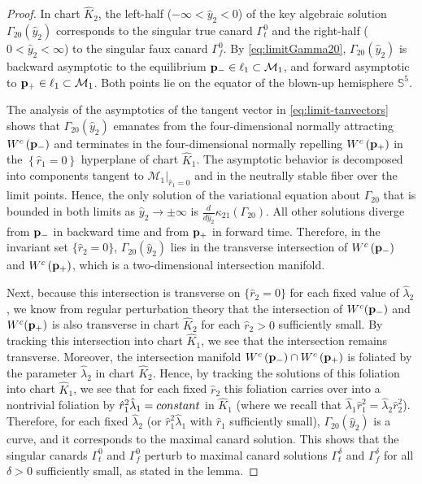 \documentclass[10pt,a4paper]{amsart}
\begin{document}
\begin{proof} 
In chart $\hat{K}_2$, the left-half ($-\infty < \hat{y}_2<0$) of the key algebraic solution $\Gamma_{20}(\hat{y}_2)$ corresponds to the singular true canard $\Gamma_{t}^0$ and the right-half ($0< \hat{y}_2 < \infty$) to the singular faux canard $\Gamma_{f}^0$.
By \eqref{eq:limitGamma20},
$\Gamma_{20}(\hat{y}_2)$ is backward asymptotic to the equilibrium ${\bf p}_{-} \in \ell_1 \subset \mathcal{M}_1$, and forward asymptotic to ${\bf p}_{+} \in \ell_1 \subset \mathcal{M}_1$.
Both points lie on the equator of the blown-up hemisphere $\mathbb{S}^5$.

The analysis of the asymptotics of the tangent vector in \eqref{eq:limit-tanvectors} shows that $\Gamma_{20}(\hat{y}_2)$ emanates from the four-dimensional normally attracting $W^{c}\left( \bf{p}_- \right)$ and terminates in the four-dimensional normally repelling $W^{c}\left( \bf{p}_+ \right)$ in the $\left\{ \hat{r}_1=0 \right\}$ hyperplane of chart $\hat{K}_1$.
The asymptotic behavior is decomposed into components tangent to 
$\mathcal{M}_{1}\rvert_{\hat{r}_{1}=0}$ and in the neutrally stable fiber over the limit points.
Hence, the only solution of the variational equation about $\Gamma_{20}$ that is bounded in both limits as $\hat{y}_2 \to \pm \infty$ is $\tfrac{d}{d\hat{y}_2}\kappa_{21}(\Gamma_{20})$.
All other solutions diverge from ${\bf p}_-$ in backward time and from ${\bf p}_+$ in forward time. 
Therefore, in the invariant set $\{ \hat r_2=0 \}$, $\Gamma_{20}(\hat{y}_2)$ lies in the transverse intersection of $W^{c}\left( \bf{p}_- \right)$ and $W^{c}\left( \bf{p}_+ \right)$, which is a two-dimensional intersection manifold.

Next, because this intersection is transverse on $\{ \hat r_2 = 0 \}$ for each fixed value of $\hat \lambda_2$, we know from regular perturbation theory that the intersection of $W^{c}({\bf p}_-)$ and $W^{c}({\bf p}_+)$ is also transverse in chart $\hat K_2$ for each $\hat r_2>0$ sufficiently small. 
By tracking this intersection into chart $\hat K_1$, we see that the intersection remains transverse.
Moreover, the intersection manifold $W^{c}\left( \bf{p}_- \right) \cap W^{c}\left( \bf{p}_+\right)$ is foliated by the parameter $\mathcal{\hat{\lambda}}_2$ in chart $\hat{K}_2$.
Hence, by tracking the solutions of this foliation into chart $\hat{K}_1$, we see that for each fixed $\hat{r}_2$ 
this foliation carries over into a nontrivial foliation by $\hat{r}_1^2 {\hat{\lambda}}_1 = {\rm constant}$ in $\hat{K}_1$
(where we recall that ${\hat{\lambda}}_1 \hat{r}_1^2 = {\hat{\lambda}}_2 \hat{r}_2^2$).
Therefore, for each fixed $\mathcal{\hat{\lambda}}_2$ (or $\hat{r}_1^2 \mathcal{\hat{\lambda}}_1$ with $\hat{r}_1$ sufficiently small), $\Gamma_{20}(\hat{y}_2)$ is a curve, and it corresponds to the maximal canard solution. 
This shows that the singular canards $\Gamma_{t}^0$ and $\Gamma_{f}^0$ perturb to maximal canard solutions $\Gamma_{t}^{\delta}$ and $\Gamma_{f}^{\delta}$ for all $\delta > 0$ sufficiently small, as stated in the lemma.


\end{proof}
\end{document}
